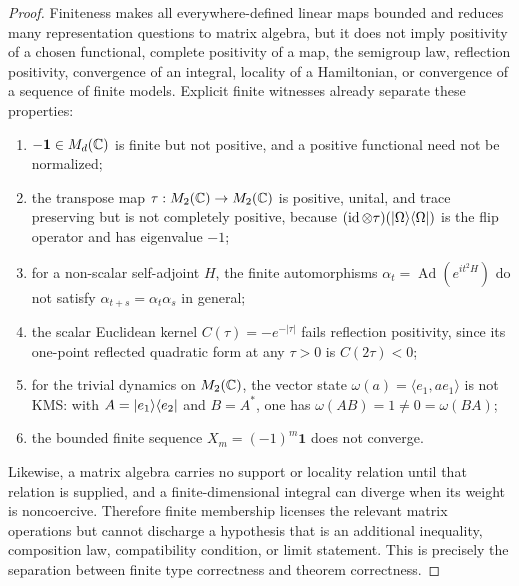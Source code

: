 \documentclass[12pt,a4paper]{article}
\begin{document}
\begin{proof}
Finiteness makes all everywhere-defined linear maps bounded and reduces many
representation questions to matrix algebra, but it does not imply positivity
of a chosen functional, complete positivity of a map, the semigroup law,
reflection positivity, convergence of an integral, locality of a Hamiltonian,
or convergence of a sequence of finite models.  Explicit finite witnesses
already separate these properties:
\begin{enumerate}[label=(\alph*), leftmargin=2.2em]
\item \(-\mathbf1\in M_d(\mathbb{C})\) is finite but not positive, and a positive
      functional need not be normalized;
\item the transpose map
      \(\tau:M_2(\mathbb{C})\to M_2(\mathbb{C})\) is positive, unital, and trace preserving
      but is not completely positive, because
      \((\operatorname{id}\otimes\tau)(\lvert \Omega \rangle\langle \Omega \rvert)\) is the flip
      operator and has eigenvalue \(-1\);
\item for a non-scalar self-adjoint \(H\), the finite automorphisms
      \(\alpha_t=\operatorname{Ad}(e^{it^2H})\) do not satisfy
      \(\alpha_{t+s}=\alpha_t\alpha_s\) in general;
\item the scalar Euclidean kernel \(C(\tau)=-e^{-|\tau|}\) fails reflection
      positivity, since its one-point reflected quadratic form at any
      \(\tau>0\) is \(C(2\tau)<0\);
\item for the trivial dynamics on \(M_2(\mathbb{C})\), the vector state
      \(\omega(a)=\langle e_1,ae_1\rangle\) is not KMS: with
      \(A=\lvert e_1 \rangle\langle e_2 \rvert\) and \(B=A^*\), one has
      \(\omega(AB)=1\ne0=\omega(BA)\);
\item the bounded finite sequence \(X_m=(-1)^m\mathbf1\) does not converge.
\end{enumerate}
Likewise, a matrix algebra carries no support or locality relation until that
relation is supplied, and a finite-dimensional integral can diverge when its
weight is noncoercive.  Therefore finite membership licenses the relevant
matrix operations but cannot discharge a hypothesis that is an additional
inequality, composition law, compatibility condition, or limit statement.
This is precisely the separation between finite type correctness and theorem
correctness.
\end{proof}
\end{document}
